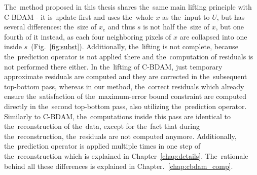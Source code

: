 The~method proposed in this thesis shares the~same main lifting principle with C-BDAM - it is update-first and uses the~whole $x$ as the~input to $U$, but has several differences: the~size of $x_e$ and thus $s$ is not half the~size of $x$, but one fourth of it instead, as each four neighboring pixels of $x$ are collapsed into one inside $s$~(Fig.~\ref{fig:subst}). Additionally, the~lifting is not complete, because the~prediction operator is not applied there and the~computation of residuals is not performed there either. In the~lifting of C-BDAM, just temporary approximate residuals are computed and they are corrected in the~subsequent top-bottom pass, whereas in our method, the~correct residuals which already ensure the~satisfaction of the~maximum-error bound constraint are computed directly in the~second top-bottom pass, also utilizing the~prediction operator. Similarly to C-BDAM, the~computations inside this pass are identical to the~reconstruction of the~data, except for the~fact that during the~reconstruction, the~residuals are not computed anymore. Additionally, the~prediction operator is applied multiple times in one step of the~reconstruction which is explained in Chapter~\ref{chap:details}. The~rationale behind all these differences is explained in Chapter.~\ref{chap:cbdam_comp}.
